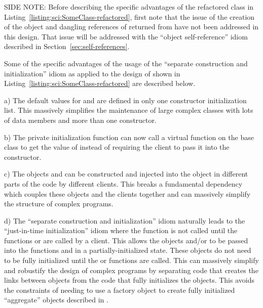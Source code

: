 \documentclass[pdf,ps2pdf,11pt]{SANDreport}
\begin{document}
SIDE NOTE: Before describing the specific advantages of the refactored
class in Listing~\ref{listing:sci:SomeClass-refactored}, first note
that the issue of the creation of the {} object and dangling
references of {} returned from {} have not been
addressed in this design.  That issue will be addressed with the
``object self-reference'' idiom described in
Section~\ref{sec:self-references}.

Some of the specific advantages of the usage of the ``separate
construction and initialization'' idiom as applied to the design of
{} shown in
Listing~\ref{listing:sci:SomeClass-refactored} are described below.

a) The default values for {} and {} are
defined in only one constructor initialization list.  This massively
simplifies the maintenance of large complex classes with lots of data
members and more than one constructor.

b) The private initialization function {}
can now call a virtual function on the base class
{} to get the value of
{} instead of requiring the client to pass it into the
constructor.

c) The objects {} and {} can be constructed and injected
into the {} object in different parts of the code by
different clients.  This breaks a fundamental dependency which couples
these objects and the clients together and can massively simplify the
structure of complex programs.

d) The ``separate construction and initialization'' idiom naturally
leads to the ``just-in-time initialization'' idiom where the
{} function is not called until the
functions {} or {} are called
by a client.  This allows the objects {} and/or {} to be
passed into the functions {}  and {} 
in a partially-initialized state.  These objects do not need to be
fully initialized until the {} or
{} functions are called.  This can massively simplify
and robustify the design of complex programs by separating code that
creates the links between objects from the code that fully initializes
the objects.  This avoids the constraints of needing to use a factory
object to create fully initialized ``aggregate'' objects described in
{}\cite{DomainDrivenDesign}.
\end{document}
